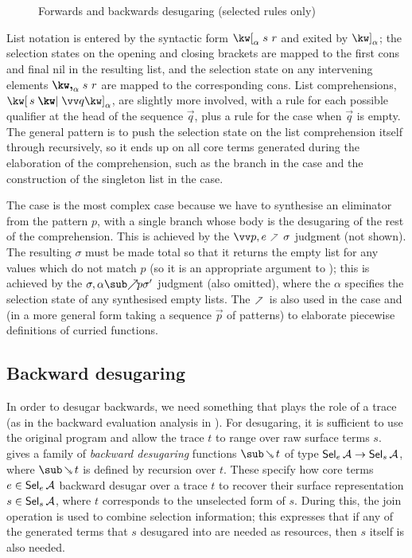 \begin{figure}
   
   \caption{Forwards and backwards desugaring (selected rules only)}
   \label{fig:surface-language:desugar}
\end{figure}

List notation is entered by the syntactic form $\annList{s}{r}{\alpha}$ and exited by $\annListEnd{\alpha}$; the selection states on the opening and closing brackets are mapped to the first cons and final nil in the resulting list, and the selection state on any intervening elements $\annListNext{s}{r}{\alpha}$ are mapped to the corresponding cons. List comprehensions, $\annListComp{s}{\vec{q}}{\alpha}$, are slightly more involved, with a rule for each possible qualifier at the head of the sequence $\vec{q}$, plus a rule for the case when $\vec{q}$ is empty. The general pattern is to push the selection state on the list comprehension itself through recursively, so it ends up on all core terms generated during the elaboration of the comprehension, such as the  branch in the  case and the construction of the singleton list in the  case.

The  case is the most complex case because we have to synthesise an eliminator from the pattern $p$, with a single branch whose body is the desugaring of the rest of the comprehension. This is achieved by the $\vec{p}, e \clauseFwdR \sigma$ judgment (not shown). The resulting $\sigma$ must be made total so that it returns the empty list for any values which do not match $p$ (so it is an appropriate argument to ); this is achieved by the $\totaliseFwd{\sigma}{\alpha}{p}{\sigma'}$ judgment (also omitted), where the $\alpha$ specifies the selection state of any synthesised empty lists. The $\clauseFwdR$ is also used in the  case and (in a more general form taking a sequence $\vec{p}$ of patterns) to elaborate piecewise definitions of curried functions.

\subsection{Backward desugaring}

In order to desugar backwards, we need something that plays the role of a trace (as in the backward evaluation analysis in ). For desugaring, it is sufficient to use the original program and allow the trace $t$ to range over raw surface terms $s$.  gives a family of \textit{backward desugaring} functions $\desugarBwdR{t}$ of type $\textup{\textsf{Sel}}_{e}\,{\mathcal{A}} \to \textup{\textsf{Sel}}_{s}\,{\mathcal{A}}$, where $\desugarBwdR{t}$ is defined by recursion over $t$. These specify how core terms $e \in \textup{\textsf{Sel}}_{e}\,{\mathcal{A}}$ backward desugar over a trace $t$ to recover their surface representation $s \in \textup{\textsf{Sel}}_{s}\,{\mathcal{A}}$, where $t$ corresponds to the unselected form of $s$. During this, the join operation is used to combine selection information; this expresses that if any of the generated terms that $s$ desugared into are needed as resources, then $s$ itself is also needed.


